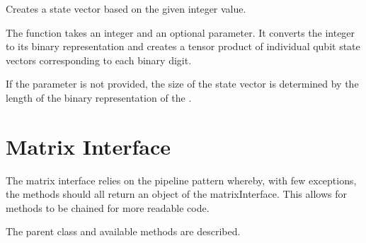 \documentclass[letterpaper,10pt,english]{sphinxmanual}
\begin{document}
\begin{fulllineitems}
\label{\detokenize{index:utils.state_vector.makeStateVector}}
\pysigstartsignatures
{}
\pysigstopsignatures
\sphinxAtStartPar
Creates a state vector based on the given integer value.

\sphinxAtStartPar
The function takes an integer  and an optional  parameter. It converts
the integer to its binary representation and creates a tensor product of individual
qubit state vectors corresponding to each binary digit.

\sphinxAtStartPar
If the  parameter is not provided, the size of the state vector is determined
by the length of the binary representation of the .

\end{fulllineitems}


\chapter{Matrix Interface}
\label{\detokenize{index:matrix-interface}}\label{\detokenize{index:module-utils.matrixInterface}}
\sphinxAtStartPar
The matrix interface relies on the pipeline pattern whereby, with few exceptions, the methods
should all return an object of the matrixInterface. This allows for methods to be chained 
for more readable code.

\sphinxAtStartPar
The parent class and available methods are described.
\end{document}
